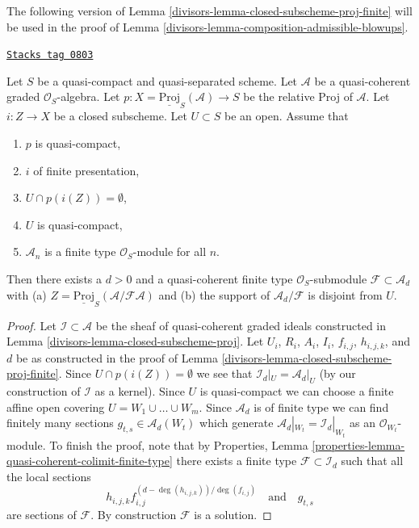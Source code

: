 The following version of Lemma \ref{divisors-lemma-closed-subscheme-proj-finite}
will be used in the proof of
Lemma \ref{divisors-lemma-composition-admissible-blowups}.

\begin{lemma}
\label{divisors-lemma-closed-subscheme-proj-finite-type}
\href{https://stacks.math.columbia.edu/tag/0803}{\texttt{Stacks tag 0803}}

Let $S$ be a quasi-compact and quasi-separated scheme.
Let $\mathcal{A}$ be a quasi-coherent graded $\mathcal{O}_S$-algebra.
Let $p : X = \underline{\text{Proj}}_S(\mathcal{A}) \to S$ be the relative
Proj of $\mathcal{A}$. Let $i : Z \to X$ be a closed subscheme.
Let $U \subset S$ be an open. Assume that
\begin{enumerate}
\item $p$ is quasi-compact,
\item $i$ of finite presentation,
\item $U \cap p(i(Z)) = \emptyset$,
\item $U$ is quasi-compact,
\item $\mathcal{A}_n$ is a finite type $\mathcal{O}_S$-module for all $n$.
\end{enumerate}
Then there exists a $d > 0$ and a quasi-coherent finite type
$\mathcal{O}_S$-submodule $\mathcal{F} \subset \mathcal{A}_d$ with (a)
$Z = \underline{\text{Proj}}_S(\mathcal{A}/\mathcal{F}\mathcal{A})$
and (b) the support of $\mathcal{A}_d/\mathcal{F}$ is disjoint from $U$.
\end{lemma}

\begin{proof}

Let $\mathcal{I} \subset \mathcal{A}$ be the sheaf of quasi-coherent
graded ideals constructed in Lemma \ref{divisors-lemma-closed-subscheme-proj}.
Let $U_i$, $R_i$, $A_i$, $I_i$, $f_{i, j}$, $h_{i, j, k}$, and $d$
be as constructed in the proof of
Lemma \ref{divisors-lemma-closed-subscheme-proj-finite}.
Since $U \cap p(i(Z)) = \emptyset$ we see that
$\mathcal{I}_d|_U = \mathcal{A}_d|_U$ (by our construction of
$\mathcal{I}$ as a kernel). Since $U$ is quasi-compact we
can choose a finite affine open covering $U = W_1 \cup \ldots \cup W_m$.
Since $\mathcal{A}_d$ is of finite type we can find finitely many sections
$g_{t, s} \in \mathcal{A}_d(W_t)$ which generate
$\mathcal{A}_d|_{W_t} = \mathcal{I}_d|_{W_t}$
as an $\mathcal{O}_{W_t}$-module. To finish the proof, note that by
Properties, Lemma \ref{properties-lemma-quasi-coherent-colimit-finite-type}
there exists a finite type $\mathcal{F} \subset \mathcal{I}_d$
such that all the local sections
$$
h_{i, j, k}f_{i, j}^{(d - \deg(h_{i, j, k}))/\deg(f_{i, j})}
\quad\text{and}\quad
g_{t, s}
$$
are sections of $\mathcal{F}$. By construction $\mathcal{F}$ is a solution.
\end{proof}

